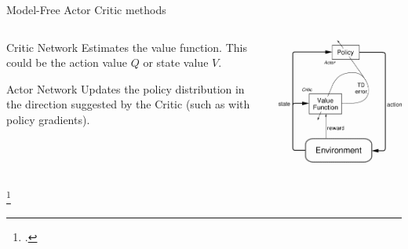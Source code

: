 \documentclass[aspectratio=169]{beamer}
\begin{document}
\begin{frame}{Model-Free Actor Critic methods}
	\begin{columns}
		\begin{column}{0.5\linewidth}
			\begin{exampleblock}{Critic Network}
				Estimates the value function. This could be the action value $Q$ or state value $V$.
			\end{exampleblock}
			\begin{exampleblock}{Actor Network}
				Updates the policy distribution in the direction suggested by the Critic (such as with policy gradients).
			\end{exampleblock}
		\end{column}
		\begin{column}{0.5\linewidth}
			\centering
			\includegraphics[width=0.8\linewidth]{img/actor_critic.png}
		\end{column}
	\end{columns}
	\footcite*{sutton2018reinforcement}
	
\end{frame}
\end{document}
